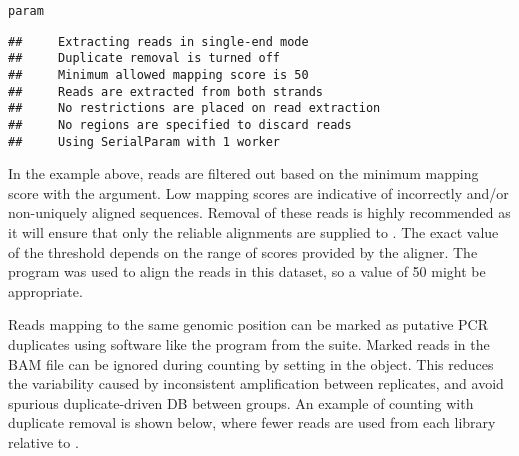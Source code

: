 \documentclass{report}\usepackage[]{graphicx}\usepackage[usenames,dvipsnames]{color}
\newcommand{\hlnum}[1]{\textcolor[rgb]{0.816,0.125,0.439}{#1}}%
\newcommand{\hlopt}[1]{\textcolor[rgb]{0,0,0}{#1}}%
\newcommand{\hlstd}[1]{\textcolor[rgb]{0.251,0.251,0.251}{#1}}%
\newcommand{\hlkwb}[1]{\textcolor[rgb]{0,0,0}{#1}}%
\newcommand{\hlkwc}[1]{\textcolor[rgb]{0.251,0.251,0.251}{#1}}%
\newcommand{\hlkwd}[1]{\textcolor[rgb]{0.878,0.439,0.125}{#1}}%
\newenvironment{knitrout}{}{} %
\begin{document}
\begin{knitrout}
\color{fgcolor}\begin{kframe}
\begin{alltt}
\hlstd{param}
\end{alltt}
\begin{verbatim}
##     Extracting reads in single-end mode
##     Duplicate removal is turned off 
##     Minimum allowed mapping score is 50 
##     Reads are extracted from both strands
##     No restrictions are placed on read extraction
##     No regions are specified to discard reads
##     Using SerialParam with 1 worker
\end{verbatim}
\end{kframe}
\end{knitrout}

In the example above, reads are filtered out based on the minimum mapping score with the  argument. 
Low mapping scores are indicative of incorrectly and/or non-uniquely aligned sequences. 
Removal of these reads is highly recommended as it will ensure that only the reliable alignments are supplied to .
The exact value of the threshold depends on the range of scores provided by the aligner. 
The  program \cite{liao2013} was used to align the reads in this dataset, so a value of 50 might be appropriate.

Reads mapping to the same genomic position can be marked as putative PCR duplicates using software like the  program from the  suite.
Marked reads in the BAM file can be ignored during counting by setting  in the  object. 
This reduces the variability caused by inconsistent amplification between replicates, and avoid spurious duplicate-driven DB between groups. 
An example of counting with duplicate removal is shown below, where fewer reads are used from each library relative to .

\begin{knitrout}
\color{fgcolor}
\end{knitrout}
\end{document}
